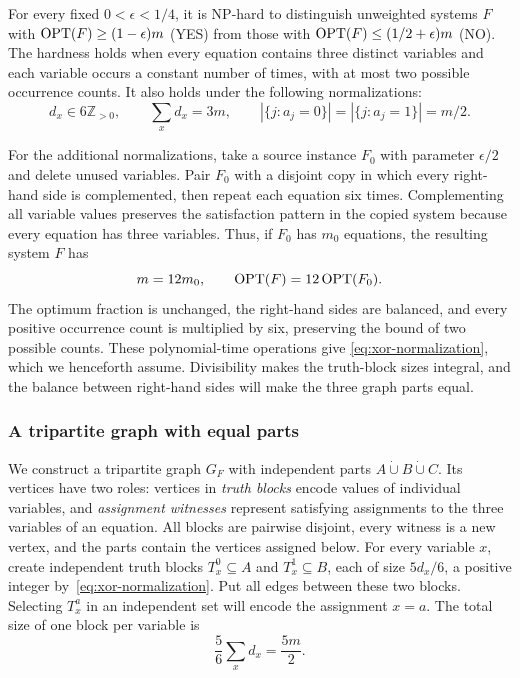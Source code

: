 \begin{theorem}\label{thm:xor-source}
For every fixed $0<\epsilon<1/4$, it is \textup{NP}-hard to distinguish unweighted systems
$F$ with $\operatorname{OPT}(F)\ge(1-\epsilon)m$ (YES) from those with
$\operatorname{OPT}(F)\le(1/2+\epsilon)m$ (NO).
The hardness holds when every equation contains three distinct
variables and each variable occurs a constant number of times, with
at most two possible occurrence counts. It also holds under the
following normalizations:
\begin{equation}\label{eq:xor-normalization}
 d_x\in6\mathbb Z_{>0},\qquad
 \sum_xd_x=3m,\qquad
 |\{j:a_j=0\}|=|\{j:a_j=1\}|=m/2.
\end{equation}
\end{theorem}

For the additional normalizations, take a source instance $F_0$ with
parameter $\epsilon/2$ and delete unused variables. Pair $F_0$ with
a disjoint copy in which every right-hand side is complemented, then
repeat each equation six times. Complementing all variable values
preserves the satisfaction pattern in the copied system because every
equation has three variables. Thus, if $F_0$ has $m_0$ equations, the
resulting system $F$ has
\[
 m=12m_0,\qquad \operatorname{OPT}(F)=12\operatorname{OPT}(F_0).
\]
The optimum fraction is unchanged, the right-hand sides are balanced,
and every positive occurrence count is multiplied by six, preserving
the bound of two possible counts. These polynomial-time operations give
\eqref{eq:xor-normalization}, which we henceforth assume.
Divisibility makes the truth-block
sizes integral, and the balance between right-hand sides will make
the three graph parts equal.

\subsubsection{A tripartite graph with equal parts}

We construct a tripartite graph $G_F$ with independent parts
$A\mathbin{\dot\cup}B\mathbin{\dot\cup}C$. Its vertices have two
roles: vertices in \emph{truth blocks} encode values of individual
variables, and \emph{assignment witnesses} represent satisfying
assignments to the three variables of an equation. All blocks are
pairwise disjoint, every witness is a new vertex, and the parts
contain the vertices assigned below.
For every variable $x$, create independent truth blocks
$T_x^0\subseteq A$ and $T_x^1\subseteq B$, each of size $5d_x/6$,
a positive integer by~\eqref{eq:xor-normalization}. Put all edges between these two blocks. Selecting
$T_x^a$ in an independent set will encode the assignment $x=a$. The
total size of one block per variable is
\begin{equation}\label{eq:xor-truth-budget}
 \frac56\sum_xd_x=\frac{5m}{2}.
\end{equation}

